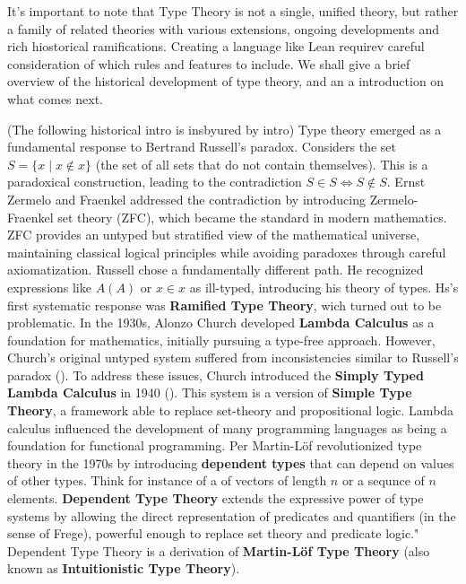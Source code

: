 It's important to note that Type Theory is not a single, unified theory, but rather a family of 
related theories with various extensions, ongoing developments and rich hiostorical ramifications. 
Creating a language like Lean requirev careful consideration of which rules and features to include.
We shall give a brief overview of the historical development of type theory, and an a introduction on 
what comes next.

(The following historical intro is insbyured by \cite{carneiro2019typetheorylean} intro)
Type theory emerged as a fundamental response to Bertrand Russell's paradox. 
Considers the set $S = \{x \mid x \notin x\}$ 
(the set of all sets that do not contain themselves). This is a paradoxical construction, 
leading to the contradiction $S \in S \iff S \notin S$. 
Ernst Zermelo and Fraenkel addressed the contradiction by introducing Zermelo-Fraenkel set theory (ZFC), 
which became the standard in modern mathematics. 
ZFC provides an untyped but stratified view of the mathematical universe, 
maintaining classical logical principles while avoiding paradoxes through careful axiomatization.
Russell chose a fundamentally different path. He recognized expressions 
like $A(A)$ or $x \in x$ as ill-typed, introducing his theory of types.
Hs's first systematic response was \textbf{Ramified Type Theory}, wich turned out to be problematic.
In the 1930s, Alonzo Church developed \textbf{Lambda Calculus} as a foundation for mathematics, 
initially pursuing a type-free approach. However, Church's original untyped system suffered from 
inconsistencies similar to Russell's paradox (\cite{wadler2015propositions}). 
To address these issues, 
Church introduced the \textbf{Simply Typed Lambda Calculus} in 1940 (\cite{church1940formulation}).  
This system is a version of \textbf{Simple Type Theory}, a framework able to replace 
set-theory and propositional logic.
Lambda calculus influenced the development of many programming languages as being a foundation for
functional programming.
Per Martin-L\"{o}f revolutionized type theory in the 1970s by introducing 
\textbf{dependent types} that can depend on values of other types.
Think for instance of a of vectors of length $n$ or a sequnce of $n$ elements.
\textbf{Dependent Type Theory} extends the expressive power of type systems by allowing the direct representation
 of predicates and quantifiers (in the sense of Frege),  powerful enough to replace set theory and predicate logic."
Dependent Type Theory is a derivation of \textbf{Martin-L\"{o}f Type Theory} 
(also known as \textbf{Intuitionistic Type Theory}).
